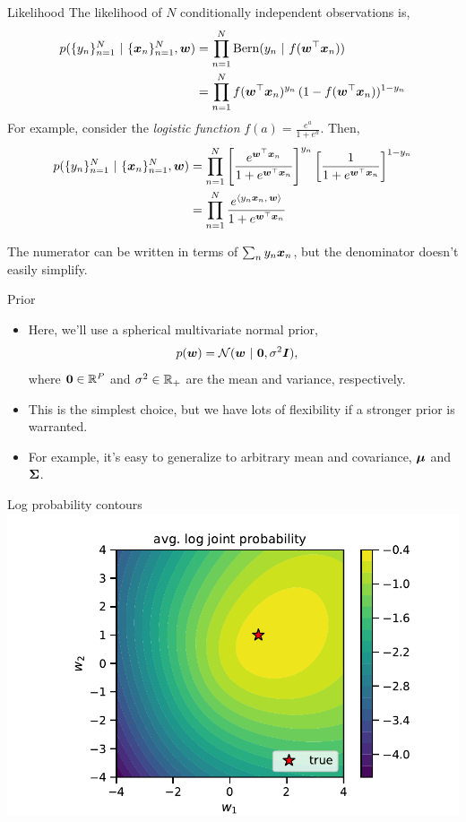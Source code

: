 \documentclass[aspectratio=169]{beamer}
\begin{document}
\begin{frame}{Likelihood}
The likelihood of $N$ conditionally independent observations is,
\begin{align}
    p(\{y_n\}_{n=1}^N ~\vert~ \{\boldsymbol{x}_n\}_{n=1}^N, \boldsymbol{w}) 
    &= 
    \prod_{n=1}^N \mathrm{Bern}(y_n ~\vert~ f(\boldsymbol{w}^\top \boldsymbol{x}_n)) \\
    &= \prod_{n=1}^N f(\boldsymbol{w}^\top \boldsymbol{x}_n)^{y_n} \, (1-f(\boldsymbol{w}^\top \boldsymbol{x}_n))^{1-y_n}
\end{align}
For example, consider the \textit{logistic function} $f(a) = \frac{e^a}{1+e^{a}}$. Then,
\begin{align}
    p(\{y_n\}_{n=1}^N ~\vert~ \{\boldsymbol{x}_n\}_{n=1}^N, \boldsymbol{w}) 
    &= \prod_{n=1}^N \left[ \frac{e^{\boldsymbol{w}^\top \boldsymbol{x}_n}}{1+e^{\boldsymbol{w}^\top \boldsymbol{x}_n}} \right]^{y_n} 
    \left[ \frac{1}{1+e^{\boldsymbol{w}^\top \boldsymbol{x}_n}} \right]^{1-y_n}
    \\
    \label{eq:ch2_lkhd}
    &= \prod_{n=1}^N \frac{e^{\langle y_n \boldsymbol{x}_n, \, \boldsymbol{w} \rangle}}{1+e^{\boldsymbol{w}^\top \boldsymbol{x}_n}}
\end{align}

The numerator can be written in terms of $\sum_n y_n \boldsymbol{x}_n$, but the denominator doesn't easily simplify. 

\end{frame}


\begin{frame}{Prior}

\begin{itemize}

\item Here, we'll use a spherical multivariate normal prior,
\begin{align}
    p(\boldsymbol{w}) &= \mathcal{N}(\boldsymbol{w} ~\vert~ \boldsymbol{0}, \sigma^2 \boldsymbol{I}),
\end{align}
where $\boldsymbol{0} \in \mathbb{R}^P$ and $\sigma^2 \in \mathbb{R}_+$ are the mean and variance, respectively.

\item This is the simplest choice, but we have lots of flexibility if a stronger prior is warranted.

\item For example, it's easy to generalize to arbitrary mean and covariance, $\boldsymbol{\mu}$ and $\boldsymbol{\Sigma}$.

\end{itemize}

\end{frame}

\begin{frame}{Log probability contours}
    \centering
    \includegraphics[width=.75\textwidth]{figures/lap2/log_joint.pdf}
\end{frame}
\end{document}
